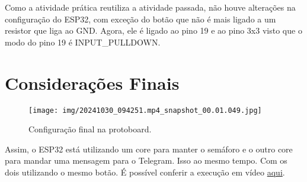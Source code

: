 \documentclass[12pt]{article}
\begin{document}
Como a atividade prática reutiliza a atividade passada, não houve alterações na configuração do ESP32, com exceção do botão que não é mais ligado a um resistor que liga ao GND. Agora, ele é ligado ao pino 19 e ao pino 3x3 visto que o modo do pino 19 é INPUT\_PULLDOWN.



\section{Considerações Finais}\label{sec:considerações-finais}\hfill

\begin{figure}[H]
    \centering
    \texttt{[image: img/20241030\_094251.mp4\_snapshot\_00.01.049.jpg]}
    \caption{Configuração final na protoboard.}
    \label{fig:protoboard}
\end{figure}

Assim, o ESP32 está utilizando um core para manter o semáforo e o outro core para mandar uma mensagem para o Telegram. Isso ao mesmo tempo. Com os dois utilizando o mesmo botão. É possível conferir a execução em vídeo \href{https://youtu.be/ta-vDilDjZk}{aqui}.
\end{document}
